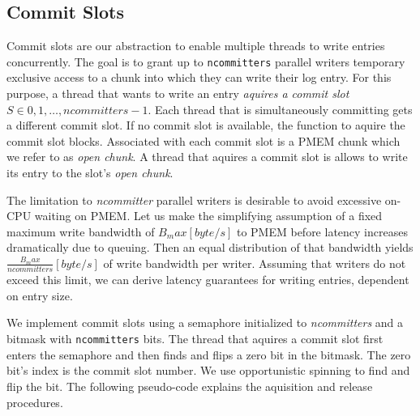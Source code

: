 \documentclass[12pt,a4paper,twoside]{book}
\begin{document}
\subsection{Commit Slots}\label{di:prb:write:chunksel}
Commit slots are our abstraction to enable multiple threads to write entries concurrently.
The goal is to grant up to \lstinline{ncommitters} parallel writers temporary exclusive access to a chunk into which they can write their log entry.
For this purpose, a thread that wants to write an entry \textit{aquires a commit slot} $S \in {0, 1, \dots, ncommitters-1}$.
Each thread that is simultaneously committing gets a different commit slot.
If no commit slot is available, the function to aquire the commit slot blocks.
Associated with each commit slot is a PMEM chunk which we refer to as \textit{open chunk}.
A thread that aquires a commit slot is allows to write its entry to the slot's \textit{open chunk}.

The limitation to \textit{ncommitter} parallel writers is desirable to avoid excessive on-CPU waiting on PMEM.
Let us make the simplifying assumption of a fixed maximum write bandwidth of $B_max [byte/s]$ to PMEM before latency increases dramatically due to queuing.
Then an equal distribution of that bandwidth yields $\frac{B_max}{ncommitters} [byte/s]$ of write bandwidth per writer.
Assuming that writers do not exceed this limit, we can derive latency guarantees for writing entries, dependent on entry size.

We implement commit slots using a semaphore initialized to \textit{ncommitters} and a bitmask with \lstinline{ncommitters} bits.
The thread that aquires a commit slot first enters the semaphore and then finds and flips a zero bit in the bitmask.
The zero bit's index is the commit slot number.
We use opportunistic spinning to find and flip the bit.
The following pseudo-code explains the aquisition and release procedures.
\end{document}
